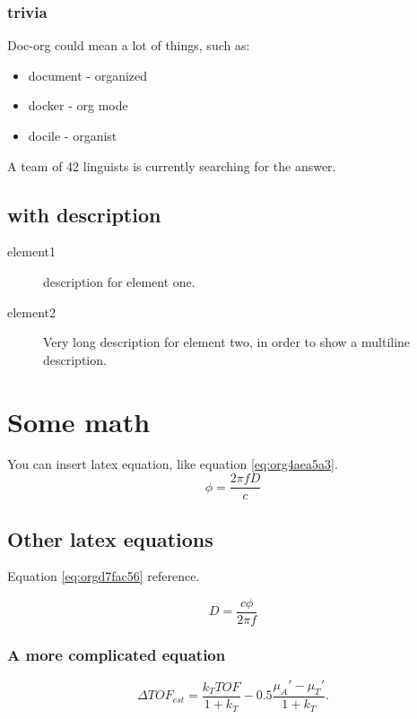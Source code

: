 \subsubsection{trivia}
\label{sec:org414cf7f}
Doc-org could mean a lot of things, such as:
\begin{itemize}
\item document - organized
\item docker - org mode
\item docile - organist
\end{itemize}
A team of 42 linguists is currently searching for the answer.
\subsection{with description}
\label{sec:orgbe7461e}
\begin{description}
\item[{element1}] description for element one.
\item[{element2}] Very long description for element two, in order to show a
multiline description.
\end{description}

\section{Some math}
\label{sec:orgee63641}
You can insert latex equation, like equation \ref{eq:org4aea5a3}.
\begin{equation}
\label{eq:org4aea5a3}
\phi = \frac{2\pi fD}{c}
\end{equation}
\subsection{Other latex equations}
\label{sec:org62884a1}
Equation \ref{eq:orgd7fac56} reference.

\begin{equation}
\label{eq:orgd7fac56}
D = \frac{c\phi}{2\pi f}
\end{equation}

\subsubsection{A more complicated equation}
\label{sec:org319784c}

\begin{equation}
\Delta TOF_{est} = \frac{k_T TOF}{1+k_T } - 0.5 \frac{\mu_A' - \mu_T'}{1+k_T}.
\end{equation}


